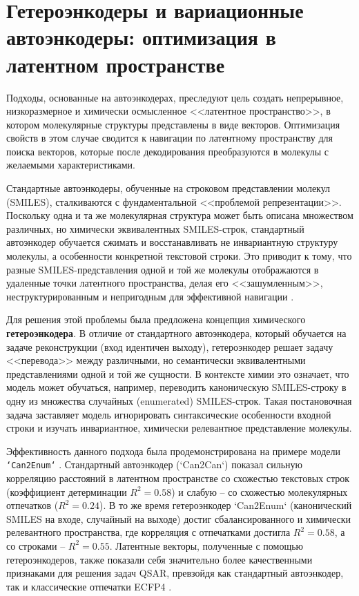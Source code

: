
\section{Гетероэнкодеры и вариационные автоэнкодеры: оптимизация в латентном пространстве}

Подходы, основанные на автоэнкодерах, преследуют цель создать непрерывное, низкоразмерное и химически осмысленное <<латентное пространство>>, в котором молекулярные структуры представлены в виде векторов. Оптимизация свойств в этом случае сводится к навигации по латентному пространству для поиска векторов, которые после декодирования преобразуются в молекулы с желаемыми характеристиками.


Стандартные автоэнкодеры, обученные на строковом представлении молекул (SMILES), сталкиваются с фундаментальной <<проблемой репрезентации>>. Поскольку одна и та же молекулярная структура может быть описана множеством различных, но химически эквивалентных SMILES-строк, стандартный автоэнкодер обучается сжимать и восстанавливать не инвариантную структуру молекулы, а особенности конкретной текстовой строки. Это приводит к тому, что разные SMILES-представления одной и той же молекулы отображаются в удаленные точки латентного пространства, делая его <<зашумленным>>, неструктурированным и непригодным для эффективной навигации \cite{bjerrum2018improving}.

Для решения этой проблемы была предложена концепция химического \textbf{гетероэнкодера}. В отличие от стандартного автоэнкодера, который обучается на задаче реконструкции (вход идентичен выходу), гетероэнкодер решает задачу <<перевода>> между различными, но семантически эквивалентными представлениями одной и той же сущности. В контексте химии это означает, что модель может обучаться, например, переводить каноническую SMILES-строку в одну из множества случайных (enumerated) SMILES-строк. Такая постановочная задача заставляет модель игнорировать синтаксические особенности входной строки и изучать инвариантное, химически релевантное представление молекулы.

Эффективность данного подхода была продемонстрирована на примере модели \texttt{‘Can2Enum‘} \cite{bjerrum2018improving}. Стандартный автоэнкодер (`Can2Can`) показал сильную корреляцию расстояний в латентном пространстве со схожестью текстовых строк (коэффициент детерминации $R^2 = 0.58$) и слабую -- со схожестью молекулярных отпечатков ($R^2 = 0.24$). В то же время гетероэнкодер `Can2Enum` (канонический SMILES на входе, случайный на выходе) достиг сбалансированного и химически релевантного пространства, где корреляция с отпечатками достигла $R^2 = 0.58$, а со строками -- $R^2 = 0.55$. Латентные векторы, полученные с помощью гетероэнкодеров, также показали себя значительно более качественными признаками для решения задач QSAR, превзойдя как стандартный автоэнкодер, так и классические отпечатки ECFP4 \cite{bjerrum2018improving}.

